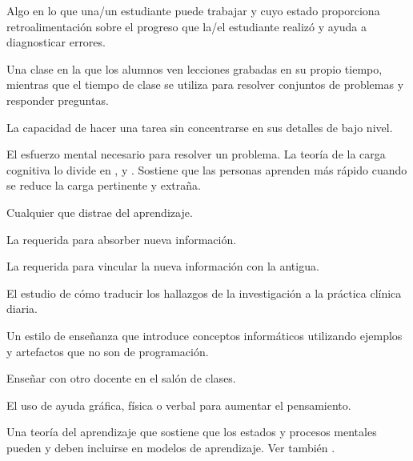 \begin{description}
 Algo en lo que una/un estudiante puede trabajar 
y cuyo estado proporciona retroalimentación sobre el progreso que la/el estudiante realizó
y ayuda a diagnosticar errores.

 Una clase en la que los alumnos 
ven lecciones grabadas en su propio tiempo, mientras que el tiempo de clase 
se utiliza para resolver conjuntos de problemas y responder preguntas.

 La capacidad de hacer una tarea sin 
concentrarse en sus detalles de bajo nivel.

 El esfuerzo mental necesario para resolver un problema.
La teoría de la carga cognitiva lo divide en
 ,
y .
Sostiene que las personas aprenden más rápido cuando se reduce la carga pertinente y extraña.

 Cualquier 
que distrae del aprendizaje.

 La 
requerida para absorber nueva información.

 La 
requerida para vincular la nueva información con la antigua.

 El estudio de cómo traducir 
los hallazgos de la investigación a la práctica clínica diaria.

 Un estilo de enseñanza que introduce 
conceptos informáticos utilizando ejemplos y artefactos que no son de programación.

 Enseñar con otro docente en el
salón de clases.

 El uso de ayuda gráfica, 
física o verbal para aumentar el pensamiento.

 Una teoría del aprendizaje que sostiene que los estados y procesos mentales pueden y deben incluirse en modelos de aprendizaje. Ver también
.


\end{description}
